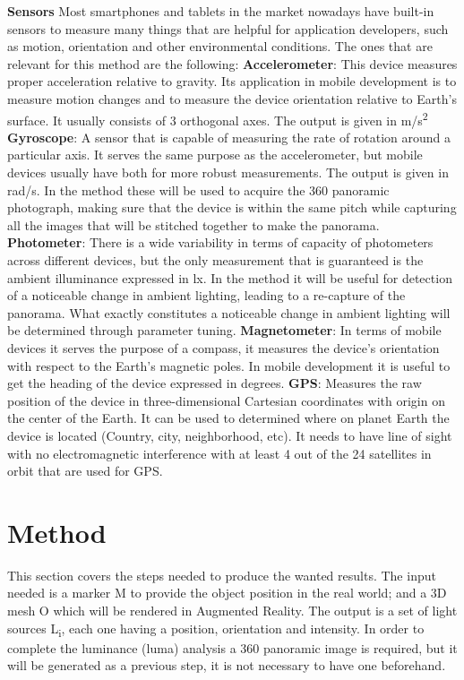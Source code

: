 \documentclass{article}
\begin{document}
\textbf{Sensors}\newline
Most smartphones and tablets in the market nowadays have built-in sensors to measure many things that are helpful for application developers, such as motion, orientation and other environmental conditions. The ones that are relevant for this method are the following:\newline
\textbf{Accelerometer}: This device measures proper acceleration relative to gravity. Its application in mobile development is to measure motion changes and to measure the device orientation relative to Earth's surface. It usually consists of 3 orthogonal axes. The output is given in m/s\textsuperscript{2} \newline
\textbf{Gyroscope}: A sensor that is capable of measuring the rate of rotation around a particular axis. It serves the same purpose as the accelerometer, but mobile devices usually have both for more robust measurements. The output is given in rad/s. In the method these will be used to acquire the 360 panoramic photograph, making sure that the device is within the same pitch while capturing all the images that will be stitched together to make the panorama. \newline
\textbf{Photometer}: There is a wide variability in terms of capacity of photometers across different devices, but the only measurement that is guaranteed is the ambient illuminance expressed in lx.  In the method it will be useful for detection of a noticeable change in ambient lighting, leading to a re-capture of the panorama. What exactly constitutes a noticeable change in ambient lighting will be determined through parameter tuning. \newline 
\textbf{Magnetometer}: In terms of mobile devices it serves the purpose of a compass, it measures the device's orientation with respect to the Earth's magnetic poles. In mobile development it is useful to get the heading of the device expressed in degrees.\newline
\textbf{GPS}: Measures the raw position of the device in three-dimensional Cartesian coordinates with origin on the center of the Earth. It can be used to determined where on planet Earth the device is located (Country, city, neighborhood, etc). It needs to have line of sight with no electromagnetic interference with at least 4 out of the 24 satellites in orbit that are used for GPS. \newline
\section{Method}
This section covers the steps needed to produce the wanted results. The input needed is a marker M to provide the object position in the real world; and a 3D mesh O which will be rendered in Augmented Reality. The output is a set of light sources L\textsubscript{i}, each one having a position, orientation and intensity. In order to complete the luminance (luma) analysis a 360 panoramic image is required, but it will be generated as a previous step, it is not necessary to have one beforehand.
\end{document}
